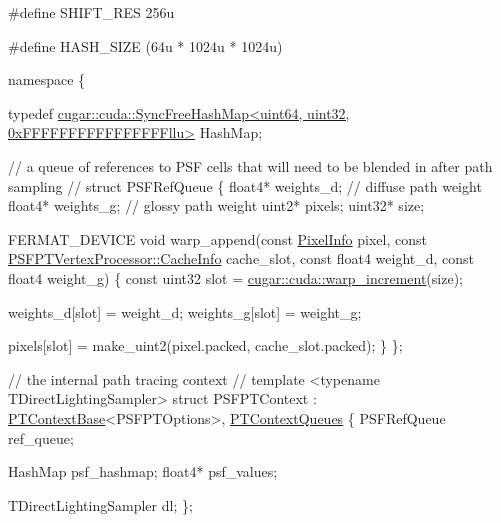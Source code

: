 \begin{DoxyCodeInclude}
\textcolor{preprocessor}{#define SHIFT\_RES   256u}

\textcolor{preprocessor}{#define HASH\_SIZE (64u * 1024u * 1024u)}


\textcolor{keyword}{namespace }\{

    \textcolor{keyword}{typedef} \hyperlink{structcugar_1_1cuda_1_1_sync_free_hash_map}{cugar::cuda::SyncFreeHashMap<uint64, uint32, 0xFFFFFFFFFFFFFFFFllu>}
       HashMap;

    \textcolor{comment}{// a queue of references to PSF cells that will need to be blended in after path sampling}
    \textcolor{comment}{//}
    \textcolor{keyword}{struct }PSFRefQueue
    \{
        float4*     weights\_d;  \textcolor{comment}{// diffuse path weight}
        float4*     weights\_g;  \textcolor{comment}{// glossy path weight}
        uint2*      pixels;
        uint32*     size;

        FERMAT\_DEVICE
        \textcolor{keywordtype}{void} warp\_append(\textcolor{keyword}{const} \hyperlink{union_pixel_info}{PixelInfo} pixel, \textcolor{keyword}{const} 
      \hyperlink{union_p_s_f_p_t_vertex_processor_1_1_cache_info}{PSFPTVertexProcessor::CacheInfo} cache\_slot, \textcolor{keyword}{const} float4 weight\_d, \textcolor{keyword}{const} 
      float4 weight\_g)
        \{
            \textcolor{keyword}{const} uint32 slot = \hyperlink{group___c_u_d_a_atomics_module_gafc8e36159201dad49d48ad3d2413f971}{cugar::cuda::warp\_increment}(size);

            weights\_d[slot] = weight\_d;
            weights\_g[slot] = weight\_g;

            pixels[slot] = make\_uint2(pixel.packed, cache\_slot.packed);
        \}
    \};

    \textcolor{comment}{// the internal path tracing context}
    \textcolor{comment}{//}
    \textcolor{keyword}{template} <\textcolor{keyword}{typename} TDirectLightingSampler>
    \textcolor{keyword}{struct }PSFPTContext : \hyperlink{struct_p_t_context_base}{PTContextBase}<PSFPTOptions>, 
      \hyperlink{struct_p_t_context_queues}{PTContextQueues}
    \{
        PSFRefQueue ref\_queue;

        HashMap     psf\_hashmap;
        float4*     psf\_values;

        TDirectLightingSampler dl;
    \};


\end{DoxyCodeInclude}
